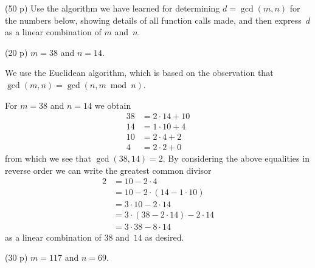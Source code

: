 \documentclass{jn-pset}
\begin{document}

\begin{problem}
  (50 p)
%
  Use the algorithm we have learned for determining
  $d = \gcd (m, n)$ for the numbers below,
  showing details of all function calls made, 
  and then express~$d$ as a linear combination of $m$ and~$n$.
  
\begin{subproblem}%
  {(20 p)}
  {\ignorespaces}
  $m = 38$ and $n=14$.
\end{subproblem}

\begin{solution}
  We use the Euclidean algorithm, which is based on the observation
  that
  $
  \gcd (m, n) 
  =
  \gcd (n, m \bmod n) 
  $.
  
  For
  $m = 38$
  and
  $n = 14$
  we obtain
  \begin{align*}   
    38 &= 2 \cdot 14 + 10 \\
    14 &= 1 \cdot 10 +  4 \\
    10 &= 2 \cdot  4 +  2 \\
    4  &= 2 \cdot  2 +  0
  \end{align*}
  from which we see that 
  $
  \gcd (38, 14) = 2
  $.
  By considering the above equalities in reverse order we
  can write the greatest common divisor
  \begin{align*}
    2 &=
        10 -  2 \cdot 4
    \\
      &=
        10 -  2 \cdot ( 14 - 1 \cdot 10 )
    \\
      &=
        3 \cdot 10 -  2 \cdot  14 
    \\
      &=
        3 \cdot
        ( 38 - 2 \cdot 14  )
        -  2 \cdot  14 
    \\
      &=
        3 \cdot 38
        -  8 \cdot  14
  \end{align*}
  as a linear combination of
  $38$ and~$14$ as desired.
\end{solution}


\begin{subproblem}%
  {(30 p)}
  {\ignorespaces}
  $m = 117$ and $n=69$.
\end{subproblem}


\end{problem}
\end{document}
